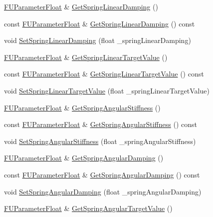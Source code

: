 \begin{DoxyCompactItemize}
\item 
\hyperlink{classFUParameterT}{FUParameterFloat} \& \hyperlink{classFCDPhysicsRigidConstraint_a041966532526b63b3a2d99d82d619672}{GetSpringLinearDamping} ()
\item 
const \hyperlink{classFUParameterT}{FUParameterFloat} \& \hyperlink{classFCDPhysicsRigidConstraint_a3d7e4e73ca4d74061e9cfdc44fab07d1}{GetSpringLinearDamping} () const 
\item 
void \hyperlink{classFCDPhysicsRigidConstraint_ac1a792e51afd1be4f909371702ab7531}{SetSpringLinearDamping} (float \_\-springLinearDamping)
\item 
\hyperlink{classFUParameterT}{FUParameterFloat} \& \hyperlink{classFCDPhysicsRigidConstraint_ad18cb64c04a05705c5a4361d8e38c7de}{GetSpringLinearTargetValue} ()
\item 
const \hyperlink{classFUParameterT}{FUParameterFloat} \& \hyperlink{classFCDPhysicsRigidConstraint_a5ceb9fe6cd3ca58ae3b89e51bf509165}{GetSpringLinearTargetValue} () const 
\item 
void \hyperlink{classFCDPhysicsRigidConstraint_ac64c51727ed14548ba623c1742a3c2f2}{SetSpringLinearTargetValue} (float \_\-springLinearTargetValue)
\item 
\hyperlink{classFUParameterT}{FUParameterFloat} \& \hyperlink{classFCDPhysicsRigidConstraint_a7365394178b22920437afa3ee217a69f}{GetSpringAngularStiffness} ()
\item 
const \hyperlink{classFUParameterT}{FUParameterFloat} \& \hyperlink{classFCDPhysicsRigidConstraint_a2d886268c987e1797655c31ee57b31b7}{GetSpringAngularStiffness} () const 
\item 
void \hyperlink{classFCDPhysicsRigidConstraint_a50eff3aece7ef1d1f3937a50c4569746}{SetSpringAngularStiffness} (float \_\-springAngularStiffness)
\item 
\hyperlink{classFUParameterT}{FUParameterFloat} \& \hyperlink{classFCDPhysicsRigidConstraint_afdf08ace1c9d9c4d27ae88aebc451591}{GetSpringAngularDamping} ()
\item 
const \hyperlink{classFUParameterT}{FUParameterFloat} \& \hyperlink{classFCDPhysicsRigidConstraint_a66e19157e6a4c5970ebcf639e157fc70}{GetSpringAngularDamping} () const 
\item 
void \hyperlink{classFCDPhysicsRigidConstraint_a231532aff9c89c29bf25997647415854}{SetSpringAngularDamping} (float \_\-springAngularDamping)
\item 
\hyperlink{classFUParameterT}{FUParameterFloat} \& \hyperlink{classFCDPhysicsRigidConstraint_a37e69d7f6a60af6447b44705bdf8b0a0}{GetSpringAngularTargetValue} ()

\end{DoxyCompactItemize}
